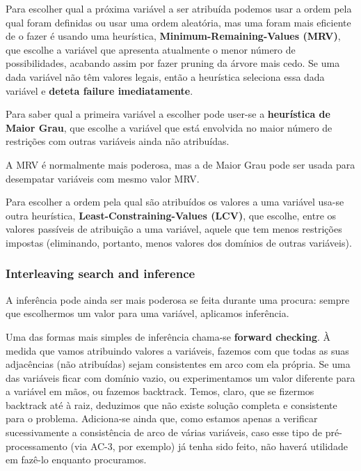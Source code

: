 \documentclass[11pt]{article}
\begin{document}
Para escolher qual a próxima variável a ser atribuída podemos usar a ordem pela qual foram definidas ou usar uma ordem aleatória, mas uma foram mais eficiente de o fazer é usando uma heurística, \textbf{Minimum-Remaining-Values (MRV)}, que escolhe a variável que apresenta atualmente o menor número de possibilidades, acabando assim por fazer pruning da árvore mais cedo. Se uma dada variável não têm valores legais, então a heurística seleciona essa dada variável e \textbf{deteta failure imediatamente}.\vspace{4pt}

Para saber qual a primeira variável a escolher pode user-se a \textbf{heurística de Maior Grau}, que escolhe a variável que está envolvida no maior número de restrições com outras variáveis ainda não atribuídas.\vspace{4pt}

A MRV é normalmente mais poderosa, mas a de Maior Grau pode ser usada para desempatar variáveis com mesmo valor MRV.\vspace{10pt}

Para escolher a ordem pela qual são atribuídos os valores a uma variável usa-se outra heurística, \textbf{Least-Constraining-Values (LCV)}, que escolhe, entre os valores passíveis de atribuição a uma variável, aquele que tem menos restrições impostas (eliminando, portanto, menos valores dos domínios de outras variáveis).

\subsubsection{Interleaving search and inference}

A inferência pode ainda ser mais poderosa se feita durante uma procura: sempre que
escolhermos um valor para uma variável, aplicamos inferência.\vspace{4pt}

Uma das formas mais simples de inferência chama-se \textbf{forward checking}. À medida que vamos atribuindo valores a variáveis, fazemos com que todas as suas adjacências (não atribuídas) sejam consistentes em arco com ela própria. Se uma das variáveis ficar com domínio vazio, ou experimentamos um valor diferente para a variável em mãos, ou fazemos backtrack. Temos, claro, que se fizermos backtrack até à raiz, deduzimos que não existe solução completa e consistente para o problema. Adiciona-se ainda que, como estamos apenas a verificar sucessivamente a consistência de arco de várias variáveis, caso esse tipo de pré-processamento (via AC-3, por exemplo) já tenha sido feito, não haverá utilidade em fazê-lo enquanto procuramos.\vspace{4pt}
\end{document}
